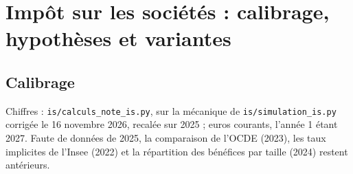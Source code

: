 \documentclass[11pt,a4paper]{article}
\begin{document}
\section{Impôt sur les sociétés : calibrage, hypothèses et variantes}\label{ann:is}

\subsection{Calibrage}\label{ann:is_calibrage}

Chiffres : \texttt{is/calculs\_note\_is.py}, sur la mécanique de \texttt{is/simulation\_is.py} corrigée le 16 novembre
2026, recalée sur 2025 ; euros courants, l'année 1 étant 2027. Faute de données de 2025, la comparaison de l'OCDE
(2023), les taux implicites de l'Insee (2022) et la répartition des bénéfices par taille (2024) restent antérieurs.
\end{document}
